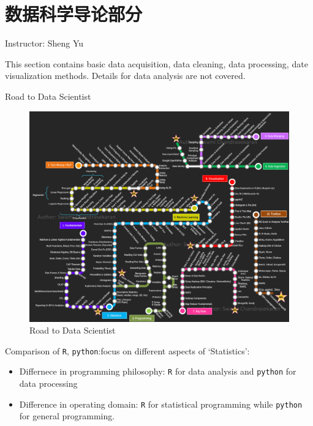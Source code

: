 \section{数据科学导论部分}\label{SecDataScience}
\begin{center}
    Instructor: Sheng Yu
\end{center}

    This section contains basic data acquisition, data cleaning, data processing, date visualization methods. Details for data analysis are not covered.

\begin{point}
    Road to Data Scientist
\end{point}

\begin{figure}[H]
    \centering
    \includegraphics[width=\linewidth]{pic/RoadToDataScientist1.png}
    \caption{Road to Data Scientist}
    \label{RoadToDataScience}
\end{figure}


Comparison of \lstinline|R|, \lstinline|python|:focus on different aspects of `Statistics':
\begin{itemize}[topsep=2pt,itemsep=0pt]
    \item Differnece in programming philosophy: \lstinline|R| for data analysis and \lstinline|python| for data processing
    \item Difference in operating domain: \lstinline|R| for statistical programming while \lstinline|python| for general programming.
\end{itemize}



